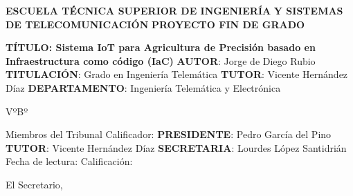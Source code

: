 \documentclass[../../memoria.tex]{subfiles}
\begin{document}
\begin{minipage}[t]{.8\textwidth}
    \bigskip
    \bigskip
    \center
    \large
    \textbf{ESCUELA TÉCNICA SUPERIOR DE INGENIERÍA}
    \vspace{7mm}
    \textbf{\hspace{1cm} Y SISTEMAS DE TELECOMUNICACIÓN}
    \bigskip
    \bigskip
    \newline
    \fontsize{17.28}{1}\selectfont
    \textbf{PROYECTO FIN DE GRADO}
    \bigskip
    \bigskip
    \newline
    \normalsize
    \begin{flushleft}
        \textbf{TÍTULO: Sistema IoT para Agricultura de Precisión basado en Infraestructura como código (IaC)}
        \bigskip
        \bigskip
        \bigskip
        \newline
        \textbf{AUTOR}: Jorge de Diego Rubio
        \bigskip
        \newline
        \textbf{TITULACIÓN}:  Grado en Ingeniería Telemática
        \bigskip
        \newline
        \bigskip
        \newline
        \textbf{TUTOR}: Vicente Hernández Díaz
        \bigskip
        \newline
        \textbf{DEPARTAMENTO}: Ingeniería Telemática y Electrónica
    \end{flushleft}

    \begin{flushright}
        \bigskip
        VºBº
    \end{flushright}

    \begin{flushleft}
        \bigskip
        Miembros del Tribunal Calificador:
        \bigskip
        \bigskip
        \newline
        \textbf{PRESIDENTE}: Pedro García del Pino
        \bigskip
        \newline
        \textbf{TUTOR}: Vicente Hernández Díaz
        \bigskip
        \newline
        \textbf{SECRETARIA}: Lourdes López Santidrián
        \bigskip
        \bigskip
        \bigskip
        \newline
        Fecha de lectura:
        \bigskip
        \bigskip
        \bigskip
        \newline
        Calificación:
    \end{flushleft}

    \begin{flushright}
        \bigskip
        \bigskip
        El Secretario,
    \end{flushright}

\end{minipage}%
\end{document}
